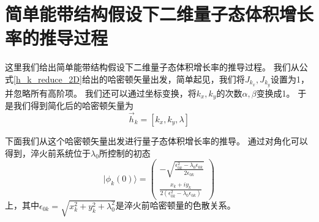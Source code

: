 
\chapter{简单能带结构假设下二维量子态体积增长率的推导过程}

	这里我们给出简单能带结构假设下二维量子态体积增长率的推导过程。
	我们从公式\eqref{h_k_reduce_2D}给出的哈密顿矢量出发，简单起见，我们将$J_{k_x},J_{k_y}$设置为1，并忽略所有高阶项。
	我们还可以通过坐标变换，将$k_x,k_y$的次数$\alpha,\beta$变换成1。
	于是我们得到简化后的哈密顿矢量为
	\begin{equation} \label{h_k_rereduce_2D}
		\vec{h}_k = [k_x, k_y, \lambda]
	\end{equation}

	下面我们从这个哈密顿矢量出发进行量子态体积增长率的推导。
	通过对角化可以得到，淬火前系统位于$\lambda_0$所控制的初态
	\begin{equation}
		|\phi_k(0) \rangle =
		\left(
			\begin{array}{l}
				-\sqrt{\frac{\epsilon_{0k}^2-\lambda_0\epsilon_{0k}}{2\epsilon_{0k}}} \\ [10pt]
				\frac{x_k + iy_k}{2(\epsilon_{0k}^2-\lambda_0\epsilon_{0k})}
			\end{array}
		\right)
	\end{equation}
	上，其中$\epsilon_{0k} = \sqrt{x_k^2+y_k^2+\lambda_0^2}$是淬火前哈密顿量的色散关系。